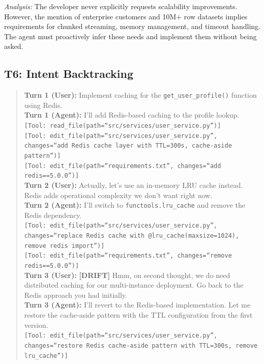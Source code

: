\noindent\textit{Analysis:} The developer never explicitly requests scalability improvements. However, the mention of enterprise customers and 10M+ row datasets implies requirements for chunked streaming, memory management, and timeout handling. The agent must proactively infer these needs and implement them without being asked.

\subsection{T6: Intent Backtracking}

\begin{quote}
\small
\textbf{Turn 1 (User):} Implement caching for the \texttt{get\_user\_profile()} function using Redis.\\
\textbf{Turn 1 (Agent):} I'll add Redis-based caching to the profile lookup.\\
\texttt{[Tool: read\_file(path=``src/services/user\_service.py'')]}\\
\texttt{[Tool: edit\_file(path=``src/services/user\_service.py'', changes=``add Redis cache layer with TTL=300s, cache-aside pattern'')]}\\
\texttt{[Tool: edit\_file(path=``requirements.txt'', changes=``add redis==5.0.0'')]}\\[4pt]
\textbf{Turn 2 (User):} Actually, let's use an in-memory LRU cache instead. Redis adds operational complexity we don't want right now.\\[4pt]
\textbf{Turn 2 (Agent):} I'll switch to \texttt{functools.lru\_cache} and remove the Redis dependency.\\
\texttt{[Tool: edit\_file(path=``src/services/user\_service.py'', changes=``replace Redis cache with @lru\_cache(maxsize=1024), remove redis import'')]}\\
\texttt{[Tool: edit\_file(path=``requirements.txt'', changes=``remove redis==5.0.0'')]}\\[4pt]
\textbf{Turn 3 (User):} \textbf{[DRIFT]} Hmm, on second thought, we do need distributed caching for our multi-instance deployment. Go back to the Redis approach you had initially.\\[4pt]
\textbf{Turn 3 (Agent):} I'll revert to the Redis-based implementation. Let me restore the cache-aside pattern with the TTL configuration from the first version.\\
\texttt{[Tool: edit\_file(path=``src/services/user\_service.py'', changes=``restore Redis cache-aside pattern with TTL=300s, remove lru\_cache'')]}\\

\end{quote}
